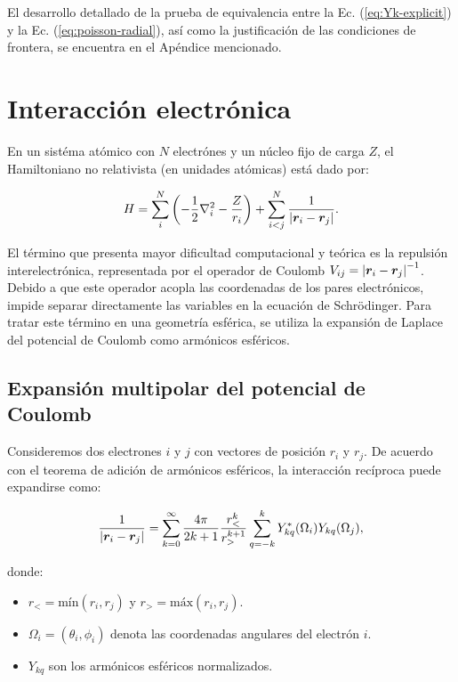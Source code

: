 \documentclass[12pt, a4paper, oneside, spanish]{book}
\begin{document}
El desarrollo detallado de la prueba de equivalencia entre la Ec. (\ref{eq:Yk-explicit}) y la Ec. (\ref{eq:poisson-radial}), así como la justificación de las condiciones de frontera, se encuentra en el Apéndice mencionado.

\section{Interacción electrónica}

En un sistéma atómico con \( N \) electrónes y un núcleo fijo de carga \( Z \), el Hamiltoniano no relativista (en unidades atómicas) está dado por:

\begin{equation}
  \label{eq:hamiltonian1}
  H = \sum_i^N \qty(- \frac{1}{2}\nabla_i^2 - \frac{Z}{r_i}) + \sum_{i<j}^N \frac{1}{\abs{\bm{r}_i-\bm{r}_j}}.
\end{equation}

El término que presenta mayor dificultad computacional y teórica es la repulsión interelectrónica, representada por el operador de Coulomb \( V_{ij} = \abs{\bm{r}_i-\bm{r}_j}^{-1} \). Debido a que este operador acopla las coordenadas de los pares electrónicos, impide separar directamente las variables en la ecuación de Schrödinger. Para tratar este término en una geometría esférica, se utiliza la expansión de Laplace del potencial de Coulomb como armónicos esféricos.

\subsection{Expansión multipolar del potencial de Coulomb}

Consideremos dos electrones \( i \) y \( j \) con vectores de posición \( r_i \) y \( r_j \). De acuerdo con el teorema de adición de armónicos esféricos, la interacción recíproca puede expandirse como:

\begin{equation}
  \label{eq:laplace1}
  \frac{1}{\abs{\bm{r}_i - \bm{r}_j}} = \sum_{k=0}^{\infty} \frac{4\pi}{2k+1} \frac{r_<^k}{r_>^{k+1}} \sum_{q = -k}^k Y_{kq}^{*}(\Omega_i) Y_{kq}(\Omega_j),
\end{equation}

donde:

\begin{itemize}
\item \( r_< = \text{mín}(r_i,r_j) \) y \( r_> = \text{máx}(r_i,r_j) \).
\item \( \Omega_i = (\theta_i, \phi_i) \) denota las coordenadas angulares del electrón \( i \).
\item \( Y_{kq} \) son los armónicos esféricos normalizados.
\end{itemize}
\end{document}

